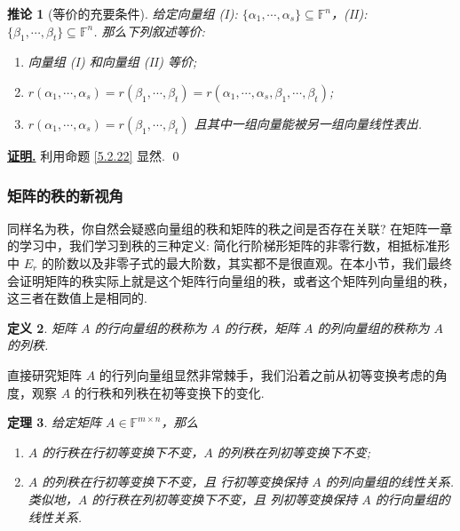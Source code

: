 \documentclass[10pt,openany]{article}
\theoremstyle{thmstyle} %
\newtheorem{theorem}{定理}[subsection]
\theoremstyle{defstyle} %
\newtheorem{definition}[theorem]{定义}
\newtheorem{corollary}[theorem]{推论}
\theoremstyle{prostyle} %
\theoremstyle{exastyle}
\theoremstyle{remstyle}
\renewenvironment{proof}[1][证明]{\par\underline{\textbf{#1.}} \;\fangsong}{\qed\par}
\newcommand{\F}{\mathbb{F}}
\newcommand{\mn}{^{m \times n}}
\begin{document}
\begin{corollary}[等价的充要条件] \label{5.2.23}
	给定向量组 (I): \( \{\alpha_1,\cdots,\alpha_s\} \subseteq \F^n \)，(II): \( \{\beta_1,\cdots,\beta_t\} \subseteq \F^n \). 那么下列叙述等价:
	\begin{enumerate}[(1)]
		\item 向量组 (I) 和向量组 (II) 等价;
		\item \( r(\alpha_1,\cdots,\alpha_s) = r(\beta_1,\cdots,\beta_t)= r(\alpha_1,\cdots,\alpha_s,\beta_1,\cdots,\beta_t) \);
		\item \( r(\alpha_1,\cdots,\alpha_s) = r(\beta_1,\cdots,\beta_t) \) 且其中一组向量能被另一组向量线性表出.
	\end{enumerate}
\end{corollary}

\begin{proof}
	利用命题 \ref{5.2.22} 显然.
\end{proof}


\subsubsection{矩阵的秩的新视角}

同样名为秩，你自然会疑惑向量组的秩和矩阵的秩之间是否存在关联? 在矩阵一章的学习中，我们学习到秩的三种定义: 简化行阶梯形矩阵的非零行数，相抵标准形中 \( E_r \) 的阶数以及非零子式的最大阶数，其实都不是很直观。在本小节，我们最终会证明矩阵的秩实际上就是这个矩阵行向量组的秩，或者这个矩阵列向量组的秩，这三者在数值上是相同的.

\begin{definition}
	矩阵 \( A \) 的行向量组的秩称为 \( A \) 的行秩，矩阵 \( A \) 的列向量组的秩称为 \( A \) 的列秩.
\end{definition}

直接研究矩阵 \( A \) 的行列向量组显然非常棘手，我们沿着之前从初等变换考虑的角度，观察 \( A \) 的行秩和列秩在初等变换下的变化.

\begin{theorem} \label{5.2.25}
	给定矩阵 \( A \in \F\mn \)，那么
	\begin{enumerate}[(1)]
		\item \( A \) 的行秩在行初等变换下不变，\( A \) 的列秩在列初等变换下不变;
		\item \( A \) 的列秩在行初等变换下不变，且{\color{red} 行初等变换保持 \( A \) 的列向量组的线性关系}. 类似地，\( A \) 的行秩在列初等变换下不变，且{\color{red} 列初等变换保持 \( A \) 的行向量组的线性关系}.
	\end{enumerate}
\end{theorem}
\end{document}
